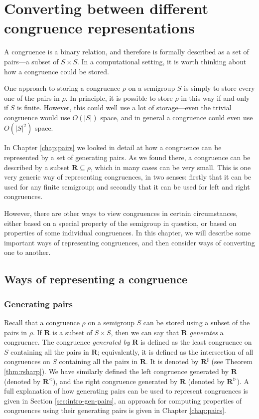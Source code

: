 \chapter{Converting between different congruence representations}
\label{chap:converting}

A congruence is a binary relation, and therefore is formally described as a set
of pairs---a subset of $S \times S$.  In a computational setting, it is worth
thinking about how a congruence could be stored.

One approach to storing a congruence $\rho$ on a semigroup $S$ is simply to
store every one of the pairs in $\rho$.  In principle, it is possible to store
$\rho$ in this way if and only if $S$ is finite.  However, this could well use a
lot of storage---even the trivial congruence would use $O(|S|)$ space, and in
general a congruence could even use $O(|S|^2)$ space.

In Chapter \ref{chap:pairs} we looked in detail at how a congruence can be
represented by a set of generating pairs.  As we found there, a congruence can
be described by a subset $\mathbf{R} \subseteq \rho$, which in many cases can be
very small.  This is one very generic way of representing congruences, in two
senses: firstly that it can be used for any finite semigroup; and secondly that
it can be used for left and right congruences.

However, there are other ways to view congruences in certain circumstances,
either based on a special property of the semigroup in question, or based on
properties of some individual congruences.  In this chapter, we will describe
some important ways of representing congruences, and then consider ways of
converting one to another.

\section{Ways of representing a congruence}

\subsection{Generating pairs}
Recall that a congruence $\rho$ on a semigroup $S$ can be stored using
a subset of the pairs in $\rho$.  If $\mathbf{R}$ is a subset of $S \times S$,
then we can say that $\mathbf{R}$ \textit{generates} a congruence.  The
congruence \textit{generated by} $\mathbf{R}$ is defined as the least congruence
on $S$ containing all the pairs in $\mathbf{R}$; equivalently, it is defined as
the intersection of all congruences on $S$ containing all the pairs in
$\mathbf{R}$.  It is denoted by $\mathbf{R}^\sharp$ (see Theorem
\ref{thm:rsharp}).  We have similarly defined the left congruence generated by
$\mathbf{R}$ (denoted by $\mathbf{R}^\triangleleft$), and the right congruence
generated by $\mathbf{R}$ (denoted by $\mathbf{R}^\triangleright$).
A full explanation of how generating pairs can be used to represent congruences
is given in Section \ref{sec:intro-gen-pairs}, an approach for computing
properties of congruences using their generating pairs is given in Chapter
\ref{chap:pairs}.

